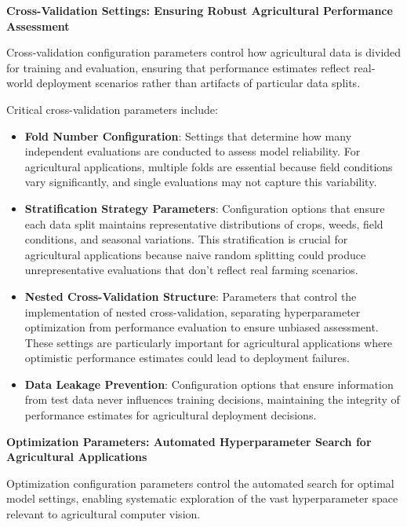 \textbf{Cross-Validation Settings: Ensuring Robust Agricultural Performance Assessment}

Cross-validation configuration parameters control how agricultural data is divided for training and evaluation, ensuring that performance estimates reflect real-world deployment scenarios rather than artifacts of particular data splits.

Critical cross-validation parameters include:

\begin{itemize}
    \item \textbf{Fold Number Configuration}: Settings that determine how many independent evaluations are conducted to assess model reliability. For agricultural applications, multiple folds are essential because field conditions vary significantly, and single evaluations may not capture this variability.
    
    \item \textbf{Stratification Strategy Parameters}: Configuration options that ensure each data split maintains representative distributions of crops, weeds, field conditions, and seasonal variations. This stratification is crucial for agricultural applications because naive random splitting could produce unrepresentative evaluations that don't reflect real farming scenarios.
    
    \item \textbf{Nested Cross-Validation Structure}: Parameters that control the implementation of nested cross-validation, separating hyperparameter optimization from performance evaluation to ensure unbiased assessment. These settings are particularly important for agricultural applications where optimistic performance estimates could lead to deployment failures.
    
    \item \textbf{Data Leakage Prevention}: Configuration options that ensure information from test data never influences training decisions, maintaining the integrity of performance estimates for agricultural deployment decisions.
\end{itemize}

\textbf{Optimization Parameters: Automated Hyperparameter Search for Agricultural Applications}

Optimization configuration parameters control the automated search for optimal model settings, enabling systematic exploration of the vast hyperparameter space relevant to agricultural computer vision.


